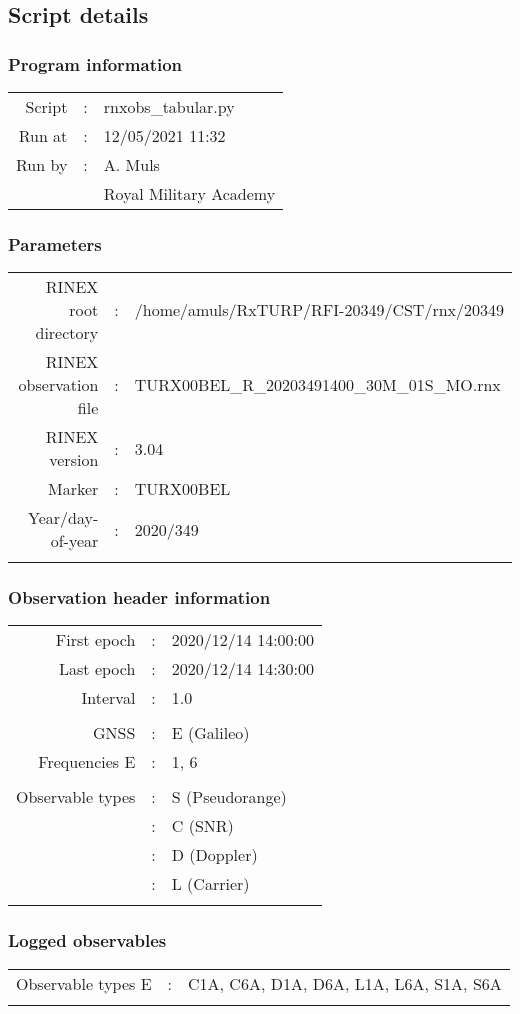 \subsection{Script details}%
\label{subsec:Scriptdetails}%
\subsubsection{Program information}%
\label{ssubsec:Programinformation}%
\setlength{\tabcolsep}{4pt}%
\begin{longtabu}[l]{rcl}%
Script&:&rnxobs\_tabular.py\\%
Run at&:&12/05/2021 11:32\\%
Run by&:&A. Muls\\%
&&Royal Military Academy\\%
\end{longtabu}

%
\subsubsection{Parameters}%
\label{ssubsec:Parameters}%
\setlength{\tabcolsep}{4pt}%
\begin{longtabu}[l]{rcl}%
RINEX root directory&:&/home/amuls/RxTURP/RFI{-}20349/CST/rnx/20349\\%
RINEX observation file&:&TURX00BEL\_R\_20203491400\_30M\_01S\_MO.rnx\\%
RINEX version&:&3.04\\%
Marker&:&TURX00BEL\\%
Year/day{-}of{-}year&:&2020/349\\%
&&\\%
\end{longtabu}

%
\subsubsection{Observation header information}%
\label{ssubsec:Observationheaderinformation}%
\setlength{\tabcolsep}{4pt}%
\begin{longtabu}[l]{rcl}%
First epoch&:&2020/12/14 14:00:00\\%
Last epoch&:&2020/12/14 14:30:00\\%
Interval&:&1.0\\%
&&\\%
GNSS&:&E (Galileo) \\%
Frequencies E&:&1, 6\\%
&&\\%
Observable types&:&S (Pseudorange) \\%
&:&C (SNR) \\%
&:&D (Doppler) \\%
&:&L (Carrier) \\%
&&\\%
\end{longtabu}

%
\subsubsection{Logged observables}%
\label{ssubsec:Loggedobservables}%
\setlength{\tabcolsep}{4pt}%
\begin{longtabu}[l]{rcl}%
Observable types E&:&C1A, C6A, D1A, D6A, L1A, L6A, S1A, S6A\\%
&&\\%
\end{longtabu}


